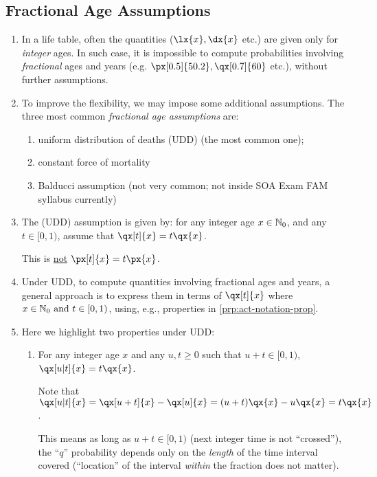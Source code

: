 \subsection{Fractional Age Assumptions}
\begin{enumerate}
\item In a life table, often the quantities (\(\lx{x},\dx{x}\) etc.) are given
only for \emph{integer} ages. In such case, it is impossible to compute probabilities
involving \emph{fractional} ages and years (e.g. \(\px[0.5]{50.2},
\qx[0.7]{60}\) etc.), without further assumptions.
\item To improve the flexibility, we may impose some additional assumptions.
The three most common \emph{fractional age assumptions} are: \begin{enumerate}
\item uniform distribution of deaths (UDD) (the most common one);
\item constant force of mortality
\item Balducci assumption (not very common; not inside SOA Exam FAM
syllabus currently)
\end{enumerate}

\item The  (UDD) assumption is given by: for
any integer age \(x\in\mathbb{N}_0\), and any \(t\in[0,1)\), assume that
\(\qx[t]{x}=t\qx{x}\).
\begin{warning}
This is \underline{not} \(\px[t]{x}=t\px{x}\).
\end{warning}
\item \label{it:udd-approach} Under UDD, to compute quantities involving fractional ages and years,
a general approach is to express them in terms of \(\qx[t]{x}\) where
\(x\in\mathbb{N}_0\text{ and }t\in[0,1)\), using, e.g., properties in \cref{prp:act-notation-prop}.
\item Here we highlight two properties under UDD:
\begin{enumerate}
\item \label{it:udd-only-length} For any integer age \(x\) and any \(u,t\ge 0\) such that \(u+t\in[0,1)\),
\(\qx[u|t]{x}=t\qx{x}\).

\begin{pf}
Note that \(\qx[u|t]{x}=\qx[u+t]{x}-\qx[u]{x}=(u+t)\qx{x}-u\qx{x}=t\qx{x}\).
\end{pf}

\begin{note}
This means as long as \(u+t\in[0,1)\) (next integer time is not ``crossed''),
the ``\(q\)'' probability depends only on the \emph{length} of the time interval
covered (``location'' of the interval \emph{within} the fraction does not
matter).
\end{note}


\end{enumerate}
\end{enumerate}
